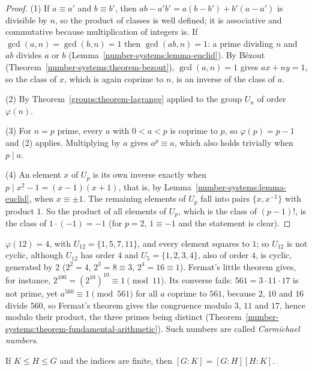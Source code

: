\begin{proof}
(1) If $a \equiv a'$ and $b \equiv b'$, then $ab - a'b' = a(b - b') + b'(a - a')$ is divisible by $n$, so the product of classes is well defined; it is associative and commutative because multiplication of
integers is. If $\gcd(a, n) = \gcd(b, n) = 1$ then $\gcd(ab, n) = 1$: a prime dividing $n$ and $ab$ divides $a$ or $b$ (Lemma~\ref{number-systems:lemma-euclid}). By B\'ezout
(Theorem~\ref{number-systems:theorem-bezout}), $\gcd(a, n) = 1$ gives $ax + ny = 1$, so the class of $x$, which is again coprime to $n$, is an inverse of the class of $a$.

(2) By Theorem~\ref{groups:theorem-lagrange} applied to the group $U_n$ of order $\varphi(n)$.

(3) For $n = p$ prime, every $a$ with $0 < a < p$ is coprime to $p$, so $\varphi(p) = p - 1$ and (2) applies. Multiplying by $a$ gives $a^p \equiv a$, which also holds trivially when $p \mid a$.

(4) An element $x$ of $U_p$ is its own inverse exactly when $p \mid x^2 - 1 = (x - 1)(x + 1)$, that is, by Lemma~\ref{number-systems:lemma-euclid}, when $x \equiv \pm1$. The remaining elements of $U_p$ fall into pairs
$\{x, x^{-1}\}$ with product $1$. So the product of all elements of $U_p$, which is the class of $(p - 1)!$, is the class of $1 \cdot (-1) = -1$ (for $p = 2$, $1 \equiv -1$ and the statement is clear).
\end{proof}

\begin{example}\label{groups:example-euler-fermat}
$\varphi(12) = 4$, with $U_{12} = \{1, 5, 7, 11\}$, and every element squares to $1$; so $U_{12}$ is not cyclic, although $U_{12}$ has order $4$ and $U_5 = \{1, 2, 3, 4\}$, also of order $4$, is cyclic,
generated by $2$ ($2^2 = 4$, $2^3 = 8 \equiv 3$, $2^4 = 16 \equiv 1$). Fermat's little theorem gives, for instance, $2^{100} = (2^{10})^{10} \equiv 1 \pmod{11}$. Its converse fails: $561 = 3 \cdot 11 \cdot 17$ is not prime, yet
$a^{560} \equiv 1 \pmod{561}$ for all $a$ coprime to $561$, because $2$, $10$ and $16$ divide $560$, so Fermat's theorem gives the congruence modulo $3$, $11$ and $17$, hence modulo their product, the three primes being distinct
(Theorem~\ref{number-systems:theorem-fundamental-arithmetic}). Such numbers are called \emph{Carmichael numbers}.
\end{example}

\begin{proposition}\label{groups:proposition-index-multiplicative}
If $K \leq H \leq G$ and the indices are finite, then $[G : K] = [G : H][H : K]$.
\end{proposition}

